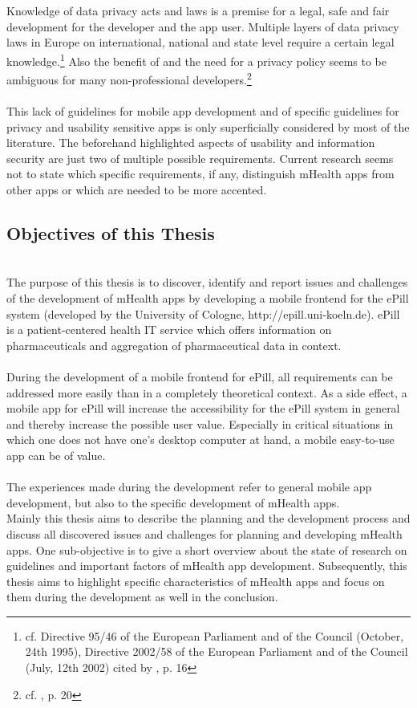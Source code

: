 \\
\\
Knowledge of data privacy acts and laws is a premise for a legal, safe and fair development for the developer and the app user. Multiple layers of data privacy laws in Europe on international, national and state level require a certain legal knowledge.\footnote{cf. Directive 95/46 of the European Parliament and of the Council (October, 24th 1995), Directive 2002/58 of the European Parliament and of the Council (July, 12th 2002) cited by \cite{FutureofPrivacyForumCenterforDemocracy&Technology.2011}, p. 16} Also the benefit of and the need for a privacy policy seems to be ambiguous for many non-professional developers.\footnote{cf. \cite{Njie.2013}, p. 20}
\\
\\
This lack of guidelines for mobile app development and of specific guidelines for privacy and usability sensitive apps is only superficially considered by most of the literature. The beforehand highlighted aspects of usability and information security are just two of multiple possible requirements. Current research seems not to state which specific requirements, if any, distinguish mHealth apps from other apps or which are needed to be more accented.

\subsection{Objectives of this Thesis}
\\
The purpose of this thesis is to discover, identify and report issues and challenges of the development of mHealth apps by developing a mobile frontend for the ePill system (developed by the University of Cologne, http://epill.uni-koeln.de). ePill is a patient-centered health IT service which offers information on pharmaceuticals and aggregation of pharmaceutical data in context.
\\
\\
During the development of a mobile frontend for ePill, all requirements can be addressed more easily than in a completely theoretical context. As a side effect, a mobile app for ePill will increase the accessibility for the ePill system in general and thereby increase the possible user value. Especially in critical situations in which one does not have one's desktop computer at hand, a mobile easy-to-use app can be of value.
\\
\\
The experiences made during the development refer to general mobile app development, but also to the specific development of mHealth apps.
\\
Mainly this thesis aims to describe the planning and the development process and discuss all discovered issues and challenges for planning and developing mHealth apps. One sub-objective is to give a short overview about the state of research on guidelines and important factors of mHealth app development. Subsequently, this thesis aims to highlight specific characteristics of mHealth apps and focus on them during the development as well in the conclusion. 